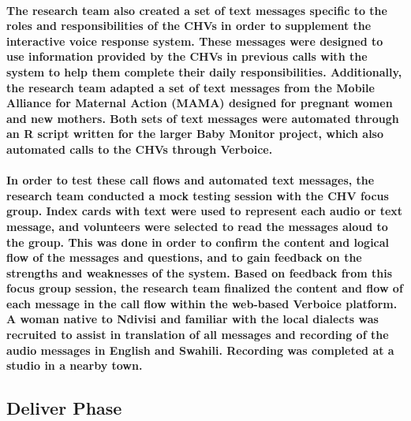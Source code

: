 \paragraph{The research team also created a set of text messages specific to the roles and responsibilities of the CHVs in order to supplement the interactive voice response system. These messages were designed to use information provided by the CHVs in previous calls with the system to help them complete their daily responsibilities. Additionally, the research team adapted a set of text messages from the Mobile Alliance for Maternal Action (MAMA) designed for pregnant women and new mothers. Both sets of text messages were automated through an R script written for the larger Baby Monitor project, which also automated calls to the CHVs through Verboice.}

\paragraph{In order to test these call flows and automated text messages, the research team conducted a mock testing session with the CHV focus group. Index cards with text were used to represent each audio or text message, and volunteers were selected to read the messages aloud to the group. This was done in order to confirm the content and logical flow of the messages and questions, and to gain feedback on the strengths and weaknesses of the system. Based on feedback from this focus group session, the research team finalized the content and flow of each message in the call flow within the web-based Verboice platform. A woman native to Ndivisi and familiar with the local dialects was recruited to assist in translation of all messages and recording of the audio messages in English and Swahili. Recording was completed at a studio in a nearby town.}


\subsection{Deliver Phase}

